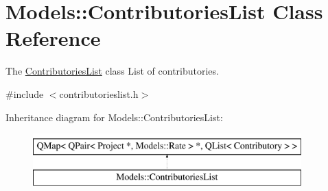 \hypertarget{classModels_1_1ContributoriesList}{\section{Models\-:\-:Contributories\-List Class Reference}
\label{classModels_1_1ContributoriesList}
}


The \hyperlink{classModels_1_1ContributoriesList}{Contributories\-List} class List of contributories.  




{\ttfamily \#include $<$contributorieslist.\-h$>$}

Inheritance diagram for Models\-:\-:Contributories\-List\-:\begin{figure}[H]
\begin{center}
\leavevmode
\includegraphics[height=2.000000cm]{d7/d6a/classModels_1_1ContributoriesList}
\end{center}
\end{figure}
